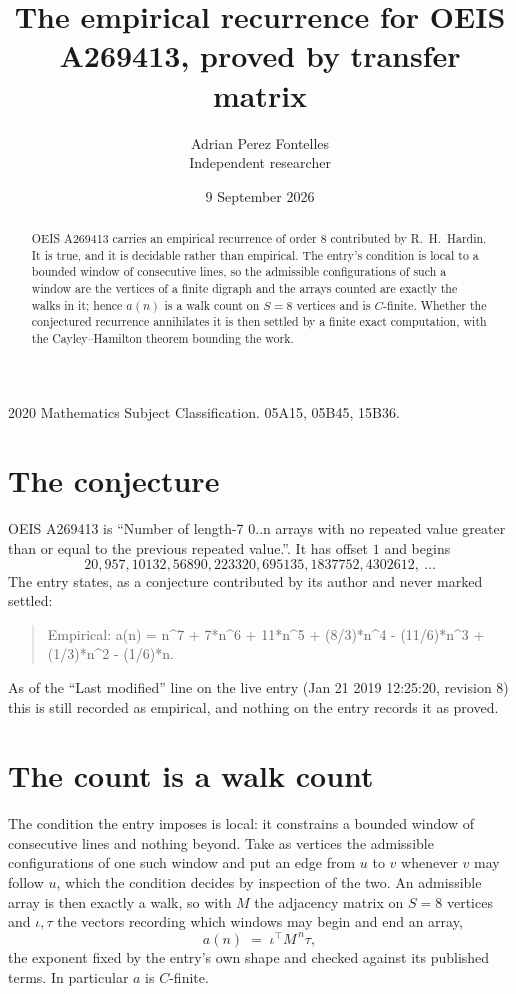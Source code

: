 \documentclass[11pt,a4paper]{article}
\title{The empirical recurrence for OEIS A269413, proved by transfer matrix}
\author{Adrian Perez Fontelles\\ \small Independent researcher}
\date{9 September 2026}
\theoremstyle{plain}
\theoremstyle{definition}
\begin{document}
\maketitle

\begin{abstract}
OEIS A269413 carries an empirical recurrence of order $8$ contributed by R.~H.~Hardin. It is
true, and it is decidable rather than empirical. The entry's condition is local to a bounded window of consecutive lines, so
the admissible configurations of such a window are the vertices of a finite digraph and the
arrays counted are exactly the walks in it; hence $a(n)$ is a walk count on $S=8$ vertices
and is $C$-finite. Whether the conjectured recurrence annihilates it is then settled by a
finite exact computation, with the Cayley--Hamilton theorem bounding the work.
\end{abstract}

\noindent\small 2020 Mathematics Subject Classification. 05A15, 05B45, 15B36.\normalsize

\section{The conjecture}

OEIS A269413 is ``Number of length-7 0..n arrays with no repeated value greater than or equal to the previous repeated value.''. It has offset $1$ and begins
\[
20, 957, 10132, 56890, 223320, 695135, 1837752, 4302612,\ \dots
\]
The entry states, as a conjecture contributed by its author and never marked settled:
\begin{quote}
Empirical: a(n) = n\^{}7 + 7*n\^{}6 + 11*n\^{}5 + (8/3)*n\^{}4 - (11/6)*n\^{}3 + (1/3)*n\^{}2 - (1/6)*n.
\end{quote}
As of the ``Last modified'' line on the live entry (Jan 21 2019 12:25:20, revision 8) this is still
recorded as empirical, and nothing on the entry records it as proved.

\section{The count is a walk count}

The condition the entry imposes is local: it constrains a bounded window of consecutive lines and nothing beyond. Take as
vertices the admissible configurations of one such window and put an edge from $u$ to $v$
whenever $v$ may follow $u$, which the condition decides by inspection of the two. An
admissible array is then exactly a walk, so with $M$ the adjacency matrix on $S=8$ vertices
and $\iota,\tau$ the vectors recording which windows may begin and end an array,
\[
a(n)\;=\;\iota^{\!\top}M^{\,n}\tau ,
\]
the exponent fixed by the entry's own shape and checked against its published terms. In
particular $a$ is $C$-finite.
\end{document}
